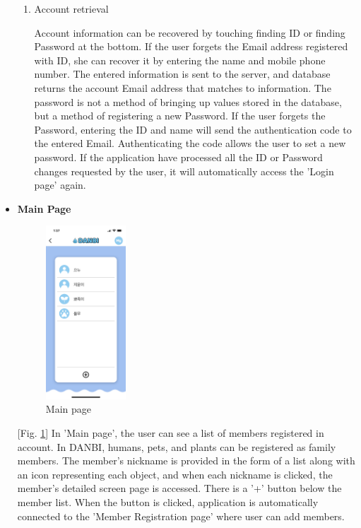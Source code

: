 \documentclass[conference]{IEEEtran}
\begin{document}
\begin{itemize}
\begin{enumerate}
\item Account retrieval

Account information can be recovered by touching finding ID or finding Password at the bottom. If the user forgets the Email address registered with ID, she can recover it by entering the name and mobile phone number. The entered information is sent to the server, and database returns the account Email address that matches to information. The password is not a method of bringing up values stored in the database, but a method of registering a new Password. If the user forgets the Password, entering the ID and name will send the authentication code to the entered Email. Authenticating the code allows the user to set a new password. If the application have processed all the ID or Password changes requested by the user, it will automatically access the 'Login page' again.

\end{enumerate}

\item \textbf{Main Page}

\par \begin{figure}[h!]
\includegraphics[width=3cm]{page/main.png}
\centering
\caption{Main page}
\label{fig:main}
\end{figure}

[Fig. \ref{fig:main}] In 'Main page', the user can see a list of members registered in account. In DANBI, humans, pets, and plants can be registered as family members. The member's nickname is provided in the form of a list along with an icon representing each object, and when each nickname is clicked, the member's detailed screen page is accessed. There is a '+' button below the member list. When the button is clicked, application is automatically connected to the 'Member Registration page' where user can add members.


\end{itemize}
\end{document}
